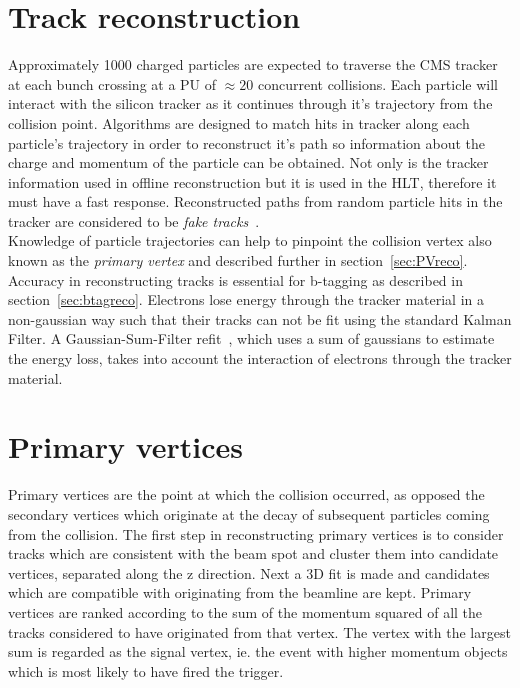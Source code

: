\section{Track reconstruction}

Approximately 1000 charged particles are expected to traverse the CMS tracker at each bunch crossing at a PU of $\approx 20$ concurrent collisions. Each particle will interact with the silicon tracker as it continues through it's trajectory from the collision point. Algorithms are designed to match hits in tracker along each particle's trajectory in order to reconstruct it's path so information about the charge and momentum of the particle can be obtained. Not only is the tracker information used in offline reconstruction but it is used in the HLT, therefore it must have a fast response. Reconstructed paths from random particle hits in the tracker are considered to be \emph{fake tracks}~\cite{1748-0221-9-10-P10009}.\\
Knowledge of particle trajectories can help to pinpoint the collision vertex also known as the \emph{primary vertex} and described further in section~\ref{sec:PVreco}. Accuracy in reconstructing tracks is essential for b-tagging as described in section~\ref{sec:btagreco}.
Electrons lose energy through the tracker material in a non-gaussian way such that their tracks can not be fit using the standard Kalman Filter. A Gaussian-Sum-Filter refit~\cite{GSF_Electron_Reconstruction_CMS}, which uses a sum of gaussians to estimate the energy loss, takes into account the interaction of electrons through the tracker material.


\section{Primary vertices \label{sec:PVreco}}

Primary vertices are the point at which the collision occurred, as opposed the secondary vertices which originate at the decay of subsequent particles coming from the collision. The first step in reconstructing primary vertices is to consider tracks which are consistent with the beam spot and cluster them into candidate vertices, separated along the z direction. Next a 3D fit is made and candidates which are compatible with originating from the beamline are kept. Primary vertices are ranked according to the sum of the momentum squared of all the tracks considered to have originated from that vertex. The vertex with the largest sum is regarded as the signal vertex, ie. the event with higher momentum objects which is most likely to have fired the trigger. 

